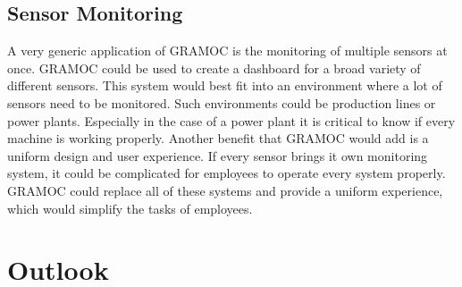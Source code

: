 \subsection{Sensor Monitoring}
A very generic application of GRAMOC is the monitoring of multiple sensors at once. GRAMOC could be used to create a dashboard for a broad variety of different sensors. This system would best fit into an environment where a lot of sensors need to be monitored. Such environments could be production lines or power plants. Especially in the case of a power plant it is critical to know if every machine is working properly. Another benefit that GRAMOC would add is a uniform design and user experience. If every sensor brings it own monitoring system, it could be complicated for employees to operate every system properly. GRAMOC could replace all of these systems and provide a uniform experience, which would simplify the tasks of employees.

\section{Outlook}
